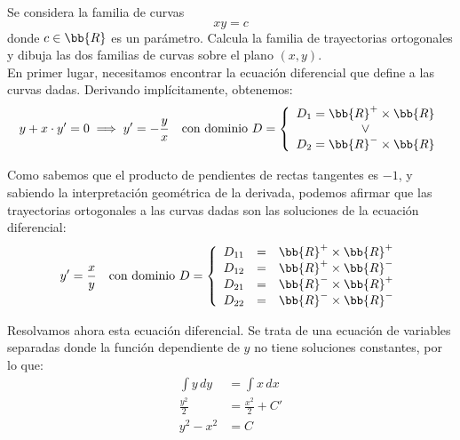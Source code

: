 \documentclass[12pt]{article}
\begin{document}
    \begin{ejercicio}
        Se considera la familia de curvas
        \begin{equation*}
            xy = c
        \end{equation*}
        donde $c \in \bb{R}$ es un parámetro. Calcula la familia de trayectorias ortogonales y dibuja las dos familias de curvas sobre el plano $(x, y)$.\\

        En primer lugar, necesitamos encontrar la ecuación diferencial que define a las curvas dadas. Derivando implícitamente, obtenemos:
        \begin{equation*}
            y + x\cdot y' = 0 \implies y' = -\frac{y}{x} \quad \text{con dominio } D=\left\{\begin{array}{c}
                D_1=\bb{R}^+\times\bb{R}\\ 
                \lor\\
                D_2=\bb{R}^-\times\bb{R}
            \end{array} \right.
        \end{equation*}

        Como sabemos que el producto de pendientes de rectas tangentes es $-1$, y sabiendo la interpretación geométrica de la derivada, podemos afirmar que las trayectorias ortogonales a las curvas dadas son las soluciones de la ecuación diferencial:
        \begin{equation*}
            y' = \frac{x}{y} \quad \text{con dominio } D=\left\{\begin{array}{rcl}
                D_{11} &=& \bb{R}^+\times\bb{R}^+\\
                D_{12} &=& \bb{R}^+\times\bb{R}^-\\
                D_{21} &=& \bb{R}^-\times\bb{R}^+\\
                D_{22} &=& \bb{R}^-\times\bb{R}^-
            \end{array} \right.
        \end{equation*}

        Resolvamos ahora esta ecuación diferencial. Se trata de una ecuación de variables separadas donde la función dependiente de $y$ no tiene soluciones constantes, por lo que:
        \begin{align*}
            \int y\,dy &= \int x\,dx\\
            \frac{y^2}{2} &= \frac{x^2}{2} + C'\\
            y^2 -x^2&= C
        \end{align*}


\end{ejercicio}
\end{document}
